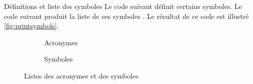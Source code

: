 \begin{dbexample}{Définitions et liste des symboles}{}
  Le code suivant définit certains symboles.
  Le code suivant produit la liste de ces symboles .
   Le résultat de ce
  code est illustré \vref{fig:printsymbols}.
\end{dbexample}

  \begin{landscape}
    \begin{figure}[p]
      \centering
      \begin{subfigure}[b]{.45\linewidth}
        \centering
        \caption{Acronymes}
        \label{fig:printacronyms}
      \end{subfigure}%
      \begin{subfigure}[b]{.45\linewidth}
        \centering
        \caption{Symboles}
        \label{fig:printsymbols}
      \end{subfigure}%
      \caption{Listes des acronymes et des symboles}
      \label{fig:printacronyms-printsymbols}
    \end{figure}
  \end{landscape}


